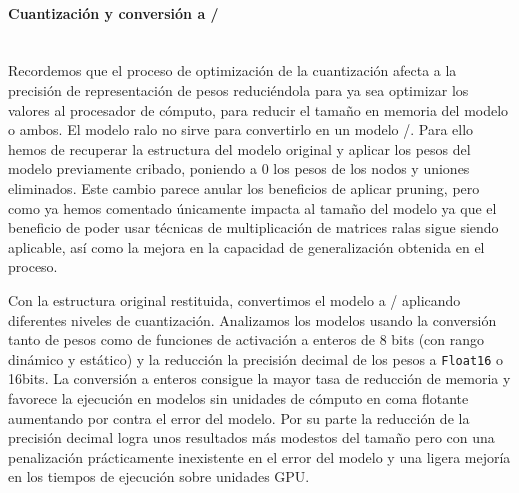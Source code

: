 
\paragraph{Cuantización y conversión a \tflite/}\\
Recordemos que el proceso de optimización de la cuantización afecta a la precisión de representación de pesos reduciéndola para ya sea optimizar los valores al procesador de cómputo, para reducir el tamaño en memoria del modelo o ambos. El modelo ralo no sirve para convertirlo en un modelo \tflite/. Para ello hemos de recuperar la estructura del modelo original y aplicar los pesos del modelo previamente cribado, poniendo a 0 los pesos de los nodos y uniones eliminados. Este cambio parece anular los beneficios de aplicar pruning, pero como ya hemos comentado únicamente impacta al tamaño del modelo ya que el beneficio de poder usar técnicas de multiplicación de matrices ralas sigue siendo aplicable, así como la mejora en la capacidad de generalización obtenida en el proceso.

Con la estructura original restituida, convertimos el modelo a \tflite/ aplicando diferentes niveles de cuantización. Analizamos los modelos usando la conversión tanto de pesos como de funciones de activación a enteros de 8 bits (con rango dinámico y estático) y la reducción la precisión decimal de los pesos a \texttt{Float16} o 16bits. La conversión a enteros consigue la mayor tasa de reducción de memoria y favorece la ejecución en modelos sin unidades de cómputo en coma flotante aumentando por contra el error del modelo. Por su parte la reducción de la precisión decimal logra unos resultados más modestos del tamaño pero con una penalización prácticamente inexistente en el error del modelo y una ligera mejoría en los tiempos de ejecución sobre unidades GPU.



